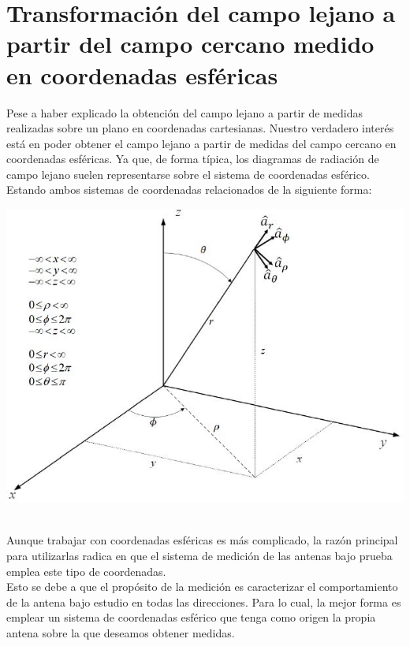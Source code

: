 \documentclass{article}
\begin{document}
\section{Transformación del campo lejano a partir del campo cercano medido en coordenadas esféricas}

Pese a haber explicado la obtención del campo lejano a partir de medidas realizadas sobre un plano en coordenadas cartesianas. Nuestro verdadero interés está en poder obtener el campo lejano a partir de medidas del campo cercano en coordenadas esféricas.
Ya que, de forma típica, los diagramas de radiación de campo lejano suelen representarse sobre el sistema de coordenadas esférico. \\

Estando ambos sistemas de coordenadas relacionados de la siguiente forma:


\includegraphics[scale=0.65]{relacion_esfericas_cartesianas}

\\ 

Aunque trabajar con coordenadas esféricas es más complicado, la razón principal para utilizarlas radica en que el sistema de medición de las antenas bajo prueba emplea este tipo de coordenadas.\\
Esto se debe a  que el propósito de la medición es caracterizar el comportamiento de la antena bajo estudio en todas las direcciones. Para lo cual,  la mejor forma es emplear un sistema de coordenadas esférico que tenga como origen la propia antena sobre la que deseamos obtener medidas.
\\
\end{document}
